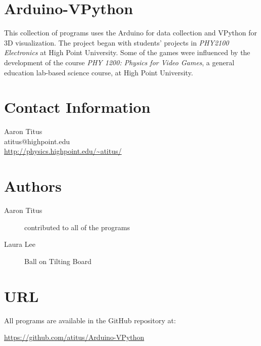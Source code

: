 \documentclass[10pt]{article}
\begin{document}
\section{Arduino-VPython}

This collection of programs uses the Arduino for data collection and VPython for 3D visualization. The project began with students' projects in \emph{PHY2100 Electronics} at High Point University. Some of the games were influenced by the development of the course \emph{PHY 1200: Physics for Video Games}, a general education lab-based science course, at High Point University.

\section{Contact Information}

Aaron Titus\\
atitus@highpoint.edu\\
\url{http://physics.highpoint.edu/~atitus/}

\section{Authors}

\begin{description}
	\item[Aaron Titus] contributed to all of the programs
	\item[Laura Lee]  Ball on Tilting Board
\end{description}



\section{URL}

All programs are available in the GitHub repository at:

\bigskip

\url{https://github.com/atitus/Arduino-VPython}
\end{document}
